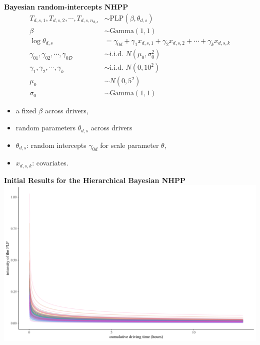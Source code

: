 \documentclass[aspectratio=43]{beamer}
\begin{document}
\begin{frame}{\textbf{Bayesian random-intercepts NHPP}}
\begin{equation}\label{eq:nhpp}
\begin{aligned}
T_{d, s, 1}, T_{d, s, 2}, \cdots , T_{d, s, n_{d, s}} & \sim \text{PLP}(\beta, \theta_{d, s})\\
\beta & \sim \text{Gamma}(1, 1)\\
\log\theta_{d, s} &= \gamma_{0d} + \gamma_{1}x_{d, s, 1} + \gamma_{2}x_{d, s, 2} + \cdots + \gamma_{k}x_{d, s, k}\\
\gamma_{01}, \gamma_{02}, \cdots, \gamma_{0D} & \sim \text{i.i.d. }N(\mu_0, \sigma_0^2)\\
\gamma_1, \gamma_2, \cdots, \gamma_k & \sim \text{i.i.d. }N(0, 10^2)\\
\mu_0 &\sim N(0, 5^2) \\
\sigma_0 &\sim \text{Gamma}(1, 1)
\end{aligned}
\tag{6}
\end{equation}
\begin{itemize}
    \item a fixed $\beta$ across drivers, 
    \item random parameters $\theta_{d, s}$ across drivers
    \item $\theta_{d, s}$: random intercepts $\gamma_{0d}$ for scale parameter $\theta$,
    \item $x_{d, s, k}$: covariates.
\end{itemize}
\end{frame}


\begin{frame}{\textbf{Initial Results for the Hierarchical Bayesian NHPP}}
    \centering
    \includegraphics[height=0.8\textheight, width=\textwidth, keepaspectratio, frame]{Figures/fit_plp.png}
    
\end{frame}
\end{document}
